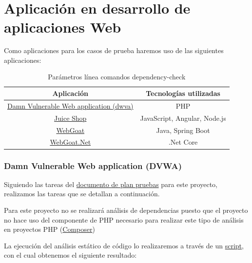 \section{Aplicación en desarrollo de aplicaciones Web} 

Como aplicaciones para los casos de prueba haremos uso de las siguientes aplicaciones:

\begin{table}
    \begin{center}
      \caption{Parámetros línea comandos dependency-check}
      \label{tab:tabla 2}
      \begin{tabular}{c|c}
        \textbf{Aplicación} & \textbf{Tecnologías utilizadas}\\
        \hline
        \href{https://dvwa.co.uk/}{Damn Vulnerable Web application (dwva)} & PHP\\ 
        \href{https://github.com/bkimminich/juice-shop}{Juice Shop} & JavaScript, Angular, Node.js\\
        \href{https://github.com/WebGoat/WebGoat}{WebGoat} &  Java, Spring Boot\\
        \href{https://github.com/tobyash86/WebGoat.NET}{WebGoat.Net} & .Net Core     
      \end{tabular}
    \end{center}
  \end{table}

\subsubsection{Damn Vulnerable Web application (DVWA)}

Siguiendo las tareas del \href{https://github.com/M0l1n3ta/PFG/blob/master/Reportes/DVWA/PPR DVWA - Plan Pruebas de Seguridad.docx}{documento de plan pruebas}
para este proyecto, realizamos las tareas que se detallan a continuación.

Para este proyecto no se realizará análisis de dependencias puesto que el proyecto no hace uso del componente de PHP 
necesario para realizar este tipo de análisis en proyectos PHP (\href{https://getcomposer.org/}{Composer})

La ejecución del análisis estático de código lo realizaremos a través de un
\href{https://github.com/M0l1n3ta/PFG/blob/master/Scripts/STAT/RunSonarScaner_DWVA.ps1}{script}, con el cual obtenemos 
el siguiente resultado:

